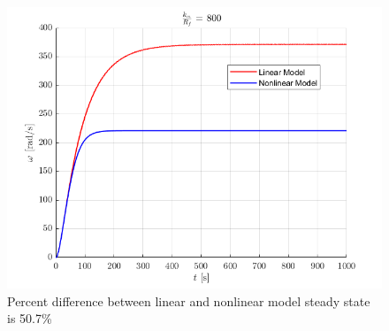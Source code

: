 \documentclass[letterpaper,12pt]{article}
\begin{document}
\begin{figure}[h!]
    \centering
    \includegraphics[scale = .5]{a800.png}
     \caption{Percent difference between linear and nonlinear model steady state is 50.7\%}
    \label{alpha800}
\end{figure}
\end{document}
